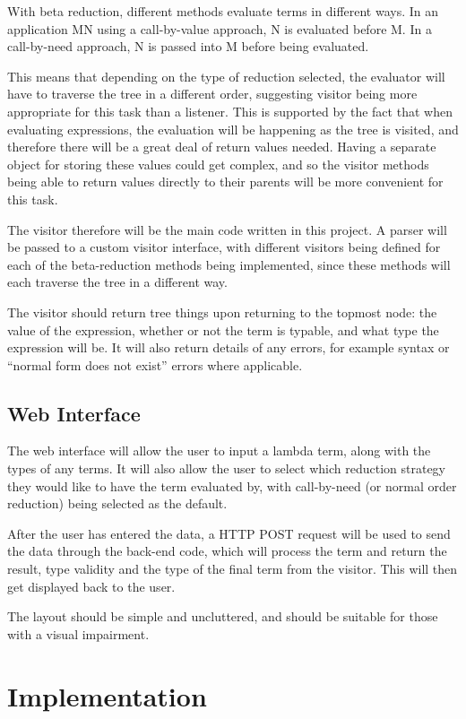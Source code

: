 \documentclass[a4paper,12pt]{report}
\begin{document}
With beta reduction, different methods evaluate terms in different ways. In an application MN using a call-by-value approach, N is evaluated before M. In a call-by-need approach, N is passed into M before being evaluated.

This means that depending on the type of reduction selected, the evaluator will have to traverse the tree in a different order, suggesting visitor being more appropriate for this task than a listener. This is supported by the fact that when evaluating expressions, the evaluation will be happening as the tree is visited, and therefore there will be a great deal of return values needed. Having a separate object for storing these values could get complex, and so the visitor methods being able to return values directly to their parents will be more convenient for this task.

The visitor therefore will be the main code written in this project. A parser will be passed to a custom visitor interface, with different visitors being defined for each of the beta-reduction methods being implemented, since these methods will each traverse the tree in a different way.

The visitor should return tree things upon returning to the topmost node: the value of the expression, whether or not the term is typable, and what type the expression will be. It will also return details of any errors, for example syntax or “normal form does not exist” errors where applicable.

\subsection{Web Interface}

The web interface will allow the user to input a lambda term, along with the types of any terms. It will also allow the user to select which reduction strategy they would like to have the term evaluated by, with call-by-need (or normal order reduction) being selected as the default.

After the user has entered the data, a HTTP POST request will be used to send the data through the back-end code, which will process the term and return the result, type validity and the type of the final term from the visitor. This will then get displayed back to the user.

The layout should be simple and uncluttered, and should be suitable for those with a visual impairment.

\section{Implementation}
\end{document}
